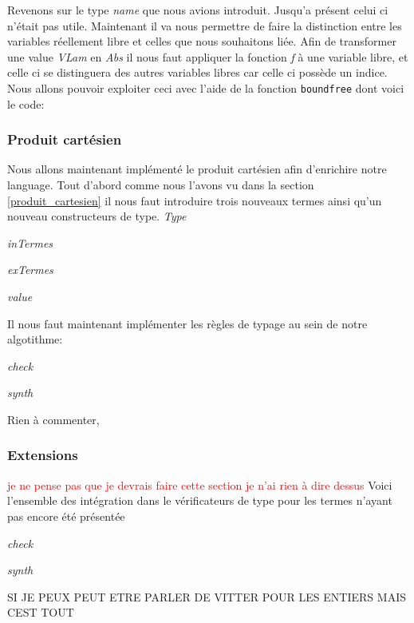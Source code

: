 \documentclass {article}
\newcommand{\codefrom}[3]
           {}
\theoremstyle{definition}
\theoremstyle{remark}
\newcommand{\todo}[1]{\textcolor{red}{#1}}
\newcommand{\fun}[1]{\lstinline!#1!}
\begin{document}
\codefrom{typed}{lambda}{value_to_inTm}
\codefrom{typed}{lambda}{neutral_to_exTm}

Revenons sur le type \emph{name} que nous avions introduit. Jusqu'a présent 
celui ci n'était pas utile. Maintenant il va nous permettre de faire la distinction 
entre les variables réellement libre et celles que nous souhaitons liée.
Afin de transformer une value \emph{VLam} en \emph{Abs} il nous faut 
appliquer la fonction \emph{f} à une variable libre, et celle ci se distinguera des
autres variables libres car celle ci possède un indice. 
Nous allons pouvoir exploiter ceci avec l'aide de la fonction \fun{boundfree} dont 
voici le code:
\codefrom{typed}{lambda}{boundfree}

\subsubsection{Produit cartésien}

Nous allons maintenant implémenté le produit cartésien afin d'enrichire notre 
language. Tout d'abord comme nous l'avons vu dans la section \ref{produit_cartesien}
il nous faut introduire trois nouveaux termes ainsi qu'un nouveau constructeurs de type.
\emph{Type}
\codefrom{typed}{lambda}{type_pair}
\emph{inTermes}
\codefrom{typed}{lambda}{inTm_pair}
\emph{exTermes}
\codefrom{typed}{lambda}{exTm_pair}
\emph{value}
\codefrom{typed}{lambda}{value_pair}

Il nous faut maintenant implémenter les règles de typage au sein de notre algotithme:

\emph{check}
\codefrom{typed}{lambda}{check_pair}
\emph{synth}
\codefrom{typed}{lambda}{synth_pair}

Rien à commenter,

\subsubsection{Extensions}
\label{extensions_implem}

\todo{je ne pense pas que je devrais faire cette section je n'ai rien à dire dessus}
Voici l'ensemble des intégration dans le vérificateurs de type pour les termes
n'ayant pas encore été présentée

\emph{check} 
\codefrom{typed}{lambda}{inTm_extensions}
\emph{synth} 
\codefrom{typed}{lambda}{exTm_extensions}

SI JE PEUX PEUT ETRE PARLER DE VITTER POUR LES ENTIERS MAIS CEST TOUT
\end{document}

